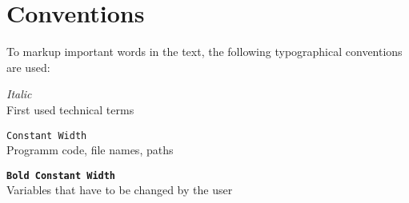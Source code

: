 \section*{Conventions}

To markup important words in the text, the following typographical conventions are used:

\begin{description}
\item \textit{Italic} \hfill \\
  First used technical terms
\item \texttt{Constant Width} \hfill \\
  Programm code, file names, paths
\item \textbf{\texttt{Bold Constant Width}} \hfill \\
  Variables that have to be changed by the user
\end{description}